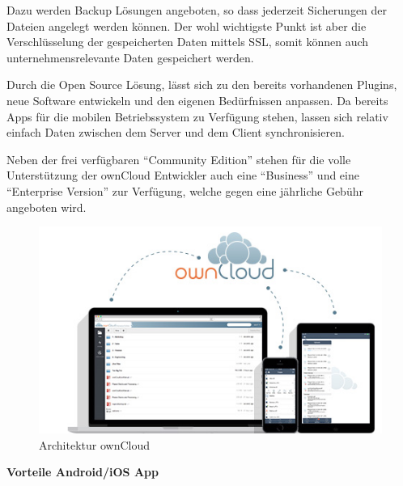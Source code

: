 Dazu werden Backup Lösungen angeboten, so dass jederzeit Sicherungen der Dateien angelegt werden können. Der wohl wichtigste Punkt ist aber die Verschlüsselung der gespeicherten Daten mittels \ac{SSL}, somit können auch unternehmensrelevante Daten gespeichert werden.

Durch die Open Source Lösung, lässt sich zu den bereits vorhandenen Plugins, neue Software entwickeln und den eigenen Bedürfnissen anpassen. Da bereits Apps für die mobilen Betriebssystem zu Verfügung stehen, lassen sich relativ einfach Daten zwischen dem Server und dem Client synchronisieren.

Neben der frei verfügbaren ``Community Edition'' stehen für die volle Unterstützung der ownCloud Entwickler auch eine ``Business'' und eine ``Enterprise Version'' zur Verfügung, welche gegen eine jährliche Gebühr angeboten wird.\cite[]{WEB:OWNCLOUD:2014}

\hspace{2 cm}

\begin{figure}[htb]
	\includegraphics[width=\textwidth]{Bilder/architecture}
	\caption{Architektur ownCloud}
	\label{Datenerfassung}
\end{figure}

\hspace{2 cm}

\textbf{Vorteile Android/iOS App}


